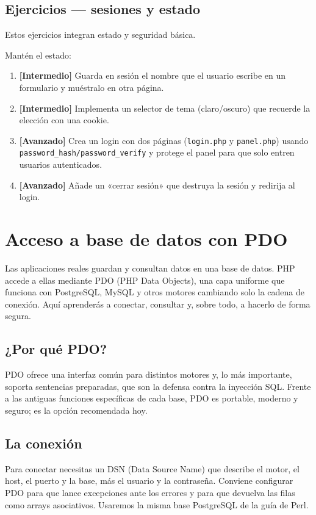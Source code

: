 \documentclass[11pt]{article}
\begin{document}
\subsection{Ejercicios — sesiones y estado}
Estos ejercicios integran estado y seguridad básica.

Mantén el estado:

\begin{enumerate}[leftmargin=1.7em,itemsep=3pt,topsep=2pt]
\item \textbf{[Intermedio]} Guarda en sesión el nombre que el usuario escribe en un formulario y muéstralo en otra página.
\item \textbf{[Intermedio]} Implementa un selector de tema (claro/oscuro) que recuerde la elección con una cookie.
\item \textbf{[Avanzado]} Crea un login con dos páginas (\texttt{login.\allowbreak{}php} y \texttt{panel.\allowbreak{}php}) usando \texttt{password\_hash/\allowbreak{}password\_verify} y protege el panel para que solo entren usuarios autenticados.
\item \textbf{[Avanzado]} Añade un «cerrar sesión» que destruya la sesión y redirija al login.
\end{enumerate}
\section{Acceso a base de datos con PDO}
Las aplicaciones reales guardan y consultan datos en una base de datos. PHP accede a ellas mediante PDO (PHP Data Objects), una capa uniforme que funciona con PostgreSQL, MySQL y otros motores cambiando solo la cadena de conexión. Aquí aprenderás a conectar, consultar y, sobre todo, a hacerlo de forma segura.

\subsection{¿Por qué PDO?}
PDO ofrece una interfaz común para distintos motores y, lo más importante, soporta sentencias preparadas, que son la defensa contra la inyección SQL. Frente a las antiguas funciones específicas de cada base, PDO es portable, moderno y seguro; es la opción recomendada hoy.

\subsection{La conexión}
Para conectar necesitas un DSN (Data Source Name) que describe el motor, el host, el puerto y la base, más el usuario y la contraseña. Conviene configurar PDO para que lance excepciones ante los errores y para que devuelva las filas como arrays asociativos. Usaremos la misma base PostgreSQL de la guía de Perl.
\end{document}
